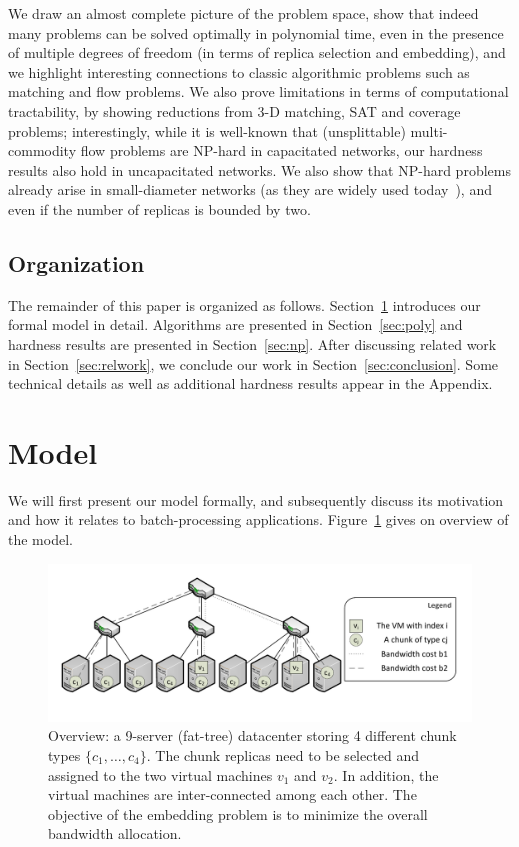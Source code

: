 \documentclass[9pt,twocolumn]{scrartcl}
\begin{document}
We draw an almost complete picture of the problem space, show that indeed many problems
can be solved optimally in polynomial time, even in the presence of multiple degrees of freedom (in terms of
replica selection and embedding), and 
we highlight interesting connections to classic algorithmic
problems such as matching and flow problems. 
We also prove limitations in terms of 
computational tractability, by showing reductions from 3-D matching, SAT and coverage problems; interestingly,
while it is well-known that (unsplittable) multi-commodity flow
problems are NP-hard in capacitated networks, our hardness results also hold in uncapacitated
networks. We also show that NP-hard problems already arise in small-diameter networks (as they are
widely used today~\cite{fattree}),
and even if the number of replicas is bounded by two.


\subsection{Organization}

The remainder of this paper is organized as follows.
Section~\ref{sec:model} introduces our formal model in detail.
Algorithms are presented in Section~\ref{sec:poly} and
hardness results are presented in Section~\ref{sec:np}.
After discussing related work in Section~\ref{sec:relwork},
we conclude our work in Section~\ref{sec:conclusion}.
Some technical details as well as additional hardness results
appear in the Appendix.

\section{Model}\label{sec:model}

We will first present our model formally, and subsequently discuss its motivation and how it relates
to batch-processing applications. Figure~\ref{fig:overview} gives on overview of the model.

\begin{figure}[t]
\centering
\includegraphics[width=0.99\columnwidth]{figs/overview-fig.pdf}
\caption{Overview: a 9-server (fat-tree) datacenter storing 4 different chunk
types $\{c_1,\ldots,c_4\}$. The chunk replicas need to be selected and assigned to the two
 virtual machines $v_1$ and $v_2$. In addition, the virtual machines are inter-connected among
 each other. The objective of the embedding problem is to minimize the overall bandwidth allocation.}
\label{fig:overview}
\end{figure}
\end{document}
